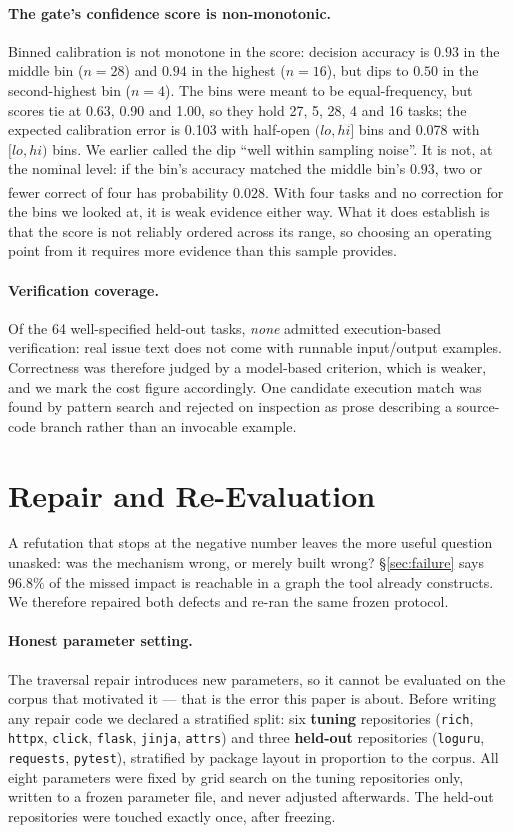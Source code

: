 \documentclass[sigconf,review,anonymous]{acmart}
\newcommand{\corr}{\textsuperscript{\dag}}
\begin{document}
\paragraph{The gate's confidence score is non-monotonic.} Binned calibration is not monotone in
the score: decision accuracy is $0.93$ in the middle bin ($n{=}28$) and $0.94$ in the highest
($n{=}16$), but dips to $0.50$ in the second-highest bin ($n{=}4$). The bins were meant to be
equal-frequency, but scores tie at 0.63, 0.90 and 1.00, so they hold 27, 5, 28, 4 and 16 tasks;
the expected calibration error is 0.103 with half-open $(lo, hi]$ bins and 0.078 with $[lo, hi)$
bins. We earlier called the dip ``well within sampling noise''. It is not, at the nominal level: if
the bin's accuracy matched the middle bin's $0.93$, two or fewer correct of four has probability
$0.028$\corr{}. With four tasks and no correction for the bins we looked at, it is weak evidence
either way. What it does establish is that the score is not
reliably ordered across its range, so choosing an operating point from it requires more evidence
than this sample provides.

\paragraph{Verification coverage.} Of the 64 well-specified held-out tasks, \emph{none} admitted
execution-based verification: real issue text does not come with runnable input/output examples.
Correctness was therefore judged by a model-based criterion, which is weaker, and we mark the
cost figure accordingly. One candidate execution match was found by pattern search and rejected
on inspection as prose describing a source-code branch rather than an invocable example.


\section{Repair and Re-Evaluation}\label{sec:repair}

A refutation that stops at the negative number leaves the more useful question unasked: was the
mechanism wrong, or merely built wrong? \S\ref{sec:failure} says $96.8\%$ of the missed impact is
reachable in a graph the tool already constructs. We therefore repaired both defects and re-ran the
same frozen protocol.

\paragraph{Honest parameter setting.} The traversal repair introduces new parameters, so it cannot be
evaluated on the corpus that motivated it --- that is the error this paper is about. Before writing
any repair code we declared a stratified split: six \textbf{tuning} repositories (\texttt{rich},
\texttt{httpx}, \texttt{click}, \texttt{flask}, \texttt{jinja}, \texttt{attrs}) and three
\textbf{held-out} repositories (\texttt{loguru}, \texttt{requests}, \texttt{pytest}), stratified by
package layout in proportion to the corpus. All eight parameters were fixed by grid search on the
tuning repositories only, written to a frozen parameter file, and never adjusted afterwards. The
held-out repositories were touched exactly once, after freezing.
\end{document}
